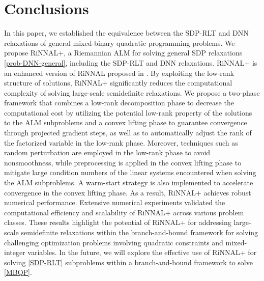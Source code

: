 \documentclass[11pt]{article}
\theoremstyle{plain}
\begin{document}
\section{Conclusions}\label{sec-conclusion}

In this paper, we established the equivalence between the SDP-RLT and DNN relaxations of general mixed-binary quadratic programming problems. 
%
We propose RiNNAL+, a Riemannian ALM for solving general SDP relaxations \eqref{prob-DNN-general}, including the SDP-RLT and DNN relaxations. 
%
RiNNAL+ is an enhanced version of RiNNAL proposed in \cite{RiNNAL}.
By exploiting the low-rank structure of solutions, RiNNAL+ significantly reduces the computational complexity of solving large-scale semidefinite relaxations. 
%
We propose a two-phase framework that combines a low-rank decomposition phase to decrease the computational cost by utilizing the potential low-rank property of the solutions to the ALM subproblems and a convex lifting phase to guarantee convergence through projected gradient steps, as well as to automatically adjust the rank of the 
factorized variable in the low-rank phase.
%
Moreover, techniques such as random perturbation are employed in the low-rank phase to avoid nonsmoothness, while preprocessing is applied in the convex lifting phase to mitigate large condition numbers of the linear systems encountered when solving the ALM subproblems. A warm-start strategy is also implemented to accelerate convergence in the convex lifting phase. As a result, RiNNAL+ achieves robust numerical performance.
%
Extensive numerical experiments validated the computational efficiency and scalability of RiNNAL+ across various problem classes. 
%
These results highlight the potential of RiNNAL+ for addressing large-scale semidefinite relaxations within the branch-and-bound framework for solving challenging optimization problems involving quadratic constraints and mixed-integer variables. In the future, we will explore the effective use of 
RiNNAL+ for solving \eqref{SDP-RLT} subproblems within a branch-and-bound framework to solve \eqref{MBQP}.













\end{document}
